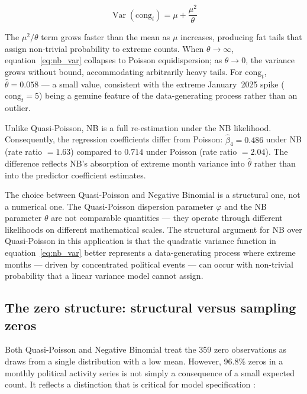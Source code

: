 \documentclass[11pt]{article}
\begin{document}
\begin{equation}
  \operatorname{Var}(\text{cong}_{t}) = \mu + \frac{\mu^2}{\theta}
  \label{eq:nb_var}
\end{equation}
 
The $\mu^2/\theta$ term grows faster than the mean as $\mu$ increases,
producing fat tails that assign non-trivial probability to extreme
counts. When $\theta \to \infty$, equation~\eqref{eq:nb_var} collapses
to Poisson equidispersion; as $\theta \to 0$, the variance grows without
bound, accommodating arbitrarily heavy tails. For $\text{cong}_{t}$,
$\hat\theta = 0.058$ --- a small value, consistent with the extreme
January~2025 spike ($\text{cong}_{t} = 5$) being a genuine feature of
the data-generating process rather than an outlier.
 
Unlike Quasi-Poisson, NB is a full re-estimation under the NB
likelihood. Consequently, the regression coefficients differ from
Poisson: $\hat\beta_4 = 0.486$ under NB (rate ratio $= 1.63$) compared
to $0.714$ under Poisson (rate ratio $= 2.04$). The difference reflects
NB's absorption of extreme month variance into $\hat\theta$ rather than
into the predictor coefficient estimates.
 
The choice between Quasi-Poisson and Negative Binomial is a structural
one, not a numerical one. The Quasi-Poisson dispersion parameter
$\varphi$ and the NB parameter $\theta$ are not comparable quantities
--- they operate through different likelihoods on different mathematical
scales. The structural argument for NB over Quasi-Poisson in this
application is that the quadratic variance function in
equation~\eqref{eq:nb_var} better represents a data-generating process
where extreme months --- driven by concentrated political events --- can
occur with non-trivial probability that a linear variance model cannot
assign.
 
\subsection{The zero structure: structural versus sampling zeros}
\label{sec:zeros}
 
Both Quasi-Poisson and Negative Binomial treat the 359 zero
observations as draws from a single distribution with a low mean.
However, 96.8\% zeros in a monthly political activity series is not
simply a consequence of a small expected count. It reflects a
distinction that is critical for model specification
\citep{Mullahy1986, Welsh2000}:
 
\end{document}
